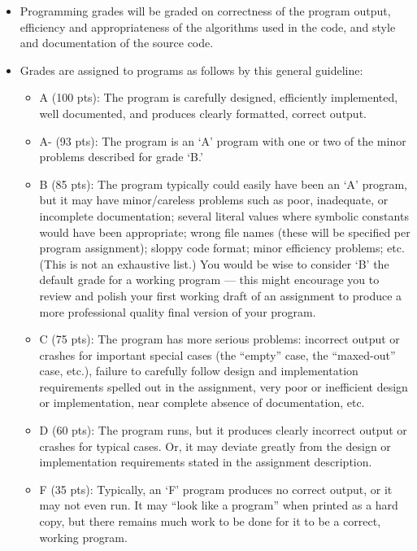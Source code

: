 \documentclass [letterpaper,11pt]{article}
\begin{document}
\begin{description}
\begin{itemize}
\item Programming grades will be graded on correctness of the program output, efficiency and appropriateness of the algorithms used in the code, and style and documentation of the source code.

\item Grades are assigned to programs as follows by this general guideline:
	\begin{itemize}
	\item 	A (100 pts): The program is carefully designed, efficiently implemented, well documented, and
produces clearly formatted, correct output. 
	\item 	A- (93 pts): The program is an `A' program with one or two of the minor problems described for
grade `B.' 
	\item	B (85 pts): The program typically could easily have been an `A' program, but it may have
minor/careless problems such as poor, inadequate, or incomplete documentation; several literal values where symbolic constants would have been appropriate; wrong file names (these will be specified per program assignment); sloppy code format; minor efficiency problems; etc. (This is not an exhaustive list.) You would be wise to consider `B' the default grade for a working program --- this might encourage you to review and polish your first working draft of an assignment to produce a more professional quality final version of your program.
\item C (75 pts): The program has more serious problems: incorrect output or crashes for important special cases (the ``empty'' case, the ``maxed-out'' case, etc.), failure to carefully follow design and implementation requirements spelled out in the assignment, very poor or inefficient design or implementation, near complete absence of documentation, etc.
\item 	D (60 pts): The program runs, but it produces clearly incorrect output or crashes for typical cases. Or, it may deviate greatly from the design or implementation requirements stated in the assignment description.
\item F (35 pts): Typically, an `F' program produces no correct output, or it may not even run. It may ``look like a program'' when printed as a hard copy, but there remains much work to be done for it to be a correct, working program.
\end{itemize}
\end{itemize}


\end{description}
\end{document}

